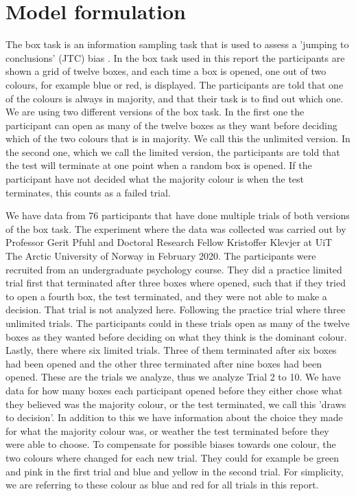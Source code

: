 \newpage
\chapter{Model formulation}
\label{Chapter_Problem_setup}
The box task is an information sampling task that is used to assess a 'jumping to conclusions' (JTC) bias \citep{balzan2017}. In the box task used in this report the participants are shown a grid of twelve boxes, and each time a box is opened, one out of two colours, for example blue or red, is displayed. The participants are told that one of the colours is always in majority, and that their task is to find out which one. We are using two different versions of the box task. In the first one the participant can open as many of the twelve boxes as they want before deciding which of the two colours that is in majority. We call this the unlimited version. In the second one, which we call the limited version, the participants are told that the test will terminate at one point when a random box is opened. If the participant have not decided what the majority colour is when the test terminates, this counts as a failed trial. 

We have data from 76 participants that have done multiple trials of both versions of the box task. The experiment where the data was collected was carried out by Professor Gerit Pfuhl and Doctoral Research Fellow Kristoffer Klevjer at UiT The Arctic University of Norway in February 2020. The participants were recruited from an undergraduate psychology course. They did a practice limited trial first that terminated after three boxes where opened, such that if they tried to open a fourth box, the test terminated, and they were not able to make a decision. That trial is not analyzed here. Following the practice trial where three unlimited trials. The participants could in these trials open as many of the twelve boxes as they wanted before deciding on what they think is the dominant colour. Lastly, there where six limited trials. Three of them terminated after six boxes had been opened and the other three terminated after nine boxes had been opened. These are the trials we analyze, thus we analyze Trial 2 to 10. We have data for how many boxes each participant opened before they either chose what they believed was the majority colour, or the test terminated, we call this 'draws to decision'. In addition to this we have information about the choice they made for what the majority colour was, or weather the test terminated before they were able to choose. To compensate for possible biases towards one colour, the two colours where changed for each new trial. They could for example be green and pink in the first trial and blue and yellow in the second trial. For simplicity, we are referring to these colour as blue and red for all trials in this report.

